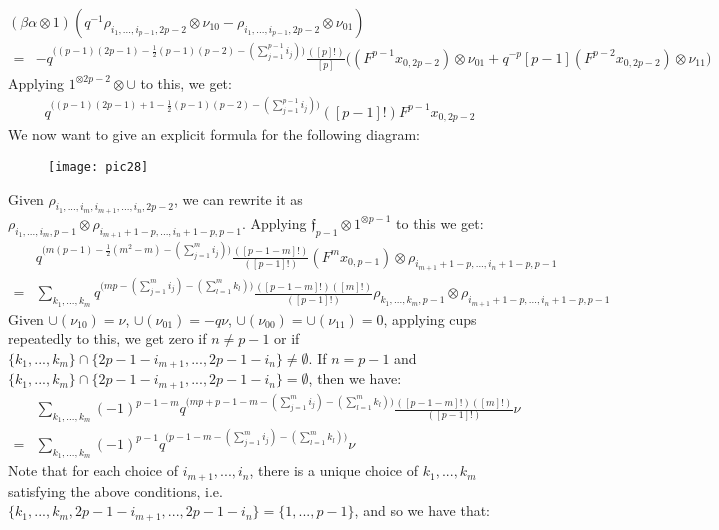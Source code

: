 \documentclass[]{article}
\begin{document}
$(\beta\alpha\otimes 1)(q^{-1}\rho_{i_{1},...,i_{p-1},2p-2}\otimes\nu_{10}-\rho_{i_{1},...,i_{p-1},2p-2}\otimes\nu_{01})$
\begin{align*}
=&-q^{\big((p-1)(2p-1)-\frac{1}{2}(p-1)(p-2)-(\sum\limits_{j=1}^{p-1}i_{j})\big)}\frac{([p]!)}{[p]}\bigg((F^{p-1}x_{0,2p-2})\otimes\nu_{01}+q^{-p}[p-1](F^{p-2}x_{0,2p-2})\otimes\nu_{11}\bigg)
\end{align*}
Applying $1^{\otimes 2p-2}\otimes\cup$ to this, we get:
\begin{align*}
q^{\big((p-1)(2p-1)+1-\frac{1}{2}(p-1)(p-2)-(\sum\limits_{j=1}^{p-1}i_{j})\big)}([p-1]!)F^{p-1}x_{0,2p-2}
\end{align*}
We now want to give an explicit formula for the following diagram:
\begin{figure}[H]
	\centering
	\texttt{[image: pic28]}
\end{figure}
Given $\rho_{i_{1},...,i_{m},i_{m+1},...,i_{n},2p-2}$, we can rewrite it as $\rho_{i_{1},...,i_{m},p-1}\otimes\rho_{i_{m+1}+1-p,...,i_{n}+1-p,p-1}$. Applying $\mathfrak{f}_{p-1}\otimes 1^{\otimes p-1}$ to this we get:
\begin{align*}
& q^{\big(m(p-1)-\frac{1}{2}(m^{2}-m)-(\sum\limits_{j=1}^{m}i_{j})\big)}\frac{([p-1-m]!)}{([p-1]!)}(F^{m}x_{0,p-1})\otimes\rho_{i_{m+1}+1-p,...,i_{n}+1-p,p-1}\\
=& \sum\limits_{k_{1},...,k_{m}}q^{\big(mp-(\sum\limits_{j=1}^{m}i_{j})-(\sum\limits_{l=1}^{m}k_{l})\big)}\frac{([p-1-m]!)([m]!)}{([p-1]!)}\rho_{k_{1},...,k_{m},p-1}\otimes\rho_{i_{m+1}+1-p,...,i_{n}+1-p,p-1}
\end{align*}
Given $\cup(\nu_{10})=\nu$, $\cup(\nu_{01})=-q\nu$, $\cup(\nu_{00})=\cup(\nu_{11})=0$, applying cups repeatedly to this, we get zero if $n\neq p-1$ or if $\{k_{1},...,k_{m}\}\cap\{2p-1-i_{m+1},...,2p-1-i_{n}\}\neq\emptyset$. If $n=p-1$ and $\{k_{1},...,k_{m}\}\cap\{2p-1-i_{m+1},...,2p-1-i_{n}\}=\emptyset$, then we have:
\begin{align*}
&\sum\limits_{k_{1},...,k_{m}}(-1)^{p-1-m}q^{\big(mp+p-1-m-(\sum\limits_{j=1}^{m}i_{j})-(\sum\limits_{l=1}^{m}k_{l})\big)}\frac{([p-1-m]!)([m]!)}{([p-1]!)}\nu\\
=&\sum\limits_{k_{1},...,k_{m}}(-1)^{p-1}q^{\big(p-1-m-(\sum\limits_{j=1}^{m}i_{j})-(\sum\limits_{l=1}^{m}k_{l})\big)}\nu
\end{align*}
Note that for each choice of $i_{m+1},...,i_{n}$, there is a unique choice of $k_{1},...,k_{m}$ satisfying the above conditions, i.e. $\{k_{1},...,k_{m},2p-1-i_{m+1},...,2p-1-i_{n}\}=\{1,...,p-1\}$, and so we have that:
\end{document}
